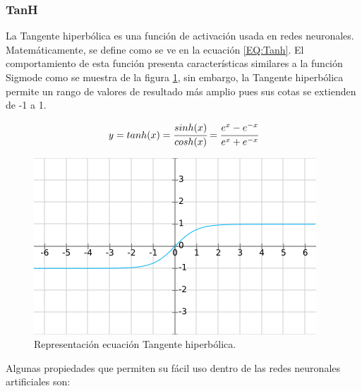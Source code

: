         \subsubsection{TanH}
        \label{sub2:FrameTanh}
            La Tangente hiperbólica  es una función de activación usada en redes neuronales. Matemáticamente, se define como se ve en la ecuación \ref{EQ:Tanh}. El comportamiento de esta función presenta características similares a la función Sigmode  como se muestra de la figura \ref{fig:Tanh}, sin embargo, la Tangente hiperbólica permite un rango de valores de resultado más amplio pues sus cotas se extienden de -1 a 1.
            
            \begin{equation}
                \label{EQ:Tanh}
                y = tanh(x) = \cfrac{sinh(x)}{cosh(x)} = \cfrac {e^{x}-e^{-x}}{e^{x}+e^{-x}}
            \end{equation}
            
            \begin{figure}[ht!]
            	\centering
            	\includegraphics[width=0.6\linewidth]{imgs/02-Referential/02-Tanh.png}
            	\caption[Representación ecuación Tangente hiperbólica]{Representación ecuación Tangente hiperbólica.}
        	    \label{fig:Tanh}
            \end{figure}%
            
            Algunas propiedades que permiten su fácil uso dentro de las redes neuronales artificiales son:
            
